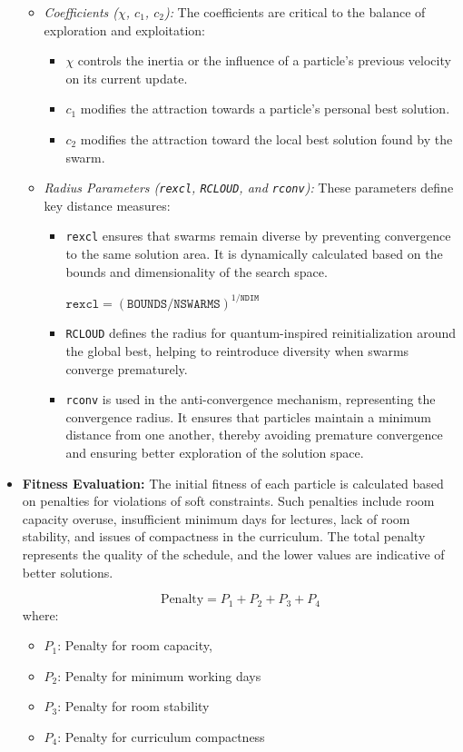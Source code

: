 \begin{itemize}
\begin{itemize}
    \item \textit{Coefficients (\(\chi\), \(c_1\), \(c_2\)):} The coefficients are critical to the balance of exploration and exploitation:
    \begin{itemize}
        \item \(\chi\) controls the inertia or the influence of a particle's previous velocity on its current update.
        \item \(c_1\) modifies the attraction towards a particle's personal best solution.
        \item \(c_2\) modifies the attraction toward the local best solution found by the swarm.
    \end{itemize}
    \item \textit{Radius Parameters (\texttt{rexcl}, \texttt{RCLOUD}, and \texttt{rconv}):} These parameters define key distance measures:
    \begin{itemize}
        \item \texttt{rexcl} ensures that swarms remain diverse by preventing convergence to the same solution area. It is dynamically calculated based on the bounds and dimensionality of the search space.
    
        \( \texttt{rexcl} = (\texttt{BOUNDS} / \texttt{NSWARMS})^{1 / \texttt{NDIM}} \)

        \item \texttt{RCLOUD} defines the radius for quantum-inspired reinitialization around the global best, helping to reintroduce diversity when swarms converge prematurely.
        \item \texttt{rconv} is used in the anti-convergence mechanism, representing the convergence radius. It ensures that particles maintain a minimum distance from one another, thereby avoiding premature convergence and ensuring better exploration of the solution space.
    \end{itemize}
\end{itemize}

    \item \textbf{Fitness Evaluation:} The initial fitness of each particle is calculated based on penalties for violations of soft constraints. Such penalties include room capacity overuse, insufficient minimum days for lectures, lack of room stability, and issues of compactness in the curriculum. The total penalty represents the quality of the schedule, and the lower values are indicative of better solutions.
    
    \[
    \text{Penalty} = P_1 + P_2 + P_3 + P_4
    \]
    where:
    \begin{itemize}
        \item $P_1$: Penalty for room capacity, 
        \item $P_2$: Penalty for minimum working days
        \item $P_3$: Penalty for room stability
        \item $P_4$: Penalty for curriculum compactness
    \end{itemize}

\end{itemize}

